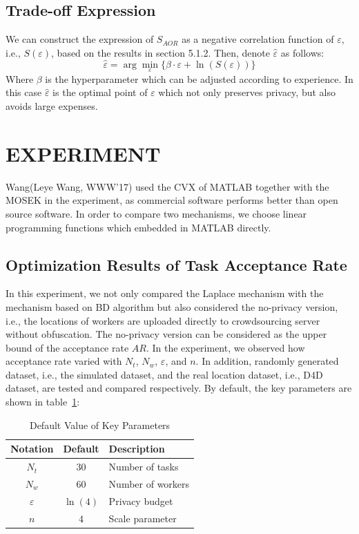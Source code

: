 \subsection{Trade-off Expression}
We can construct the expression of $S_{AOR}$ as a negative correlation function of $\varepsilon$, i.e., $S(\varepsilon)$, based on the results in section 5.1.2. Then, denote $\hat{\varepsilon}$ as follows:
$$
	\hat{\varepsilon}=\arg \min_\varepsilon \{ \beta \cdot \varepsilon + \ln (S(\varepsilon)) \}
$$
Where $\beta$ is the hyperparameter which can be adjusted according to experience. In this case $\hat{\varepsilon}$ is the optimal point of $\varepsilon$ which not only preserves privacy, but also avoids large expenses.

\section{EXPERIMENT}
Wang(Leye Wang, WWW’17) used the CVX of MATLAB together with the MOSEK in the experiment, as commercial software performs better than open source software. In order to compare two mechanisms, we choose linear programming functions which embedded in MATLAB directly.

\subsection{Optimization Results of Task Acceptance Rate}
In this experiment, we not only compared the Laplace mechanism with the mechanism based on BD algorithm but also considered the no-privacy version, i.e., the locations of workers are uploaded directly to crowdsourcing server without obfuscation. The no-privacy version can be considered as the upper bound of the acceptance rate $AR$. In the experiment, we observed how acceptance rate varied with $N_t$, $N_w$, $\varepsilon$, and $n$. In addition, randomly generated dataset, i.e., the simulated dataset, and the real location dataset, i.e., D4D dataset, are tested and compared respectively. By default, the key parameters are shown in table~\ref{tab:deft}:
\begin{table}
  \caption{Default Value of Key Parameters}
  \label{tab:deft}
  \begin{tabular}{ccl}
    \toprule
    Notation & Default & Description\\
    \midrule
    $N_t$ & $30$ & Number of tasks\\
    $N_w$ & $60$ & Number of workers\\
    $\varepsilon$ & $\ln (4)$ & Privacy budget\\
    $n$ & $4$ & Scale parameter\\
  \bottomrule
\end{tabular}
\end{table}

